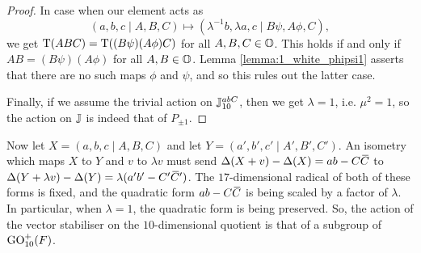 \begin{proof}
    In case when our element acts as
    \begin{equation*}
   		(a,b,c\mid A,B,C) \mapsto (\lambda^{-1} b, \lambda a, c \mid B\psi, A\phi, C),
   	\end{equation*}
    we get $\operatorname{T}(ABC) = \operatorname{T}((B\psi) (A\phi) C)$
    for all $A,B,C \in \mathbb{O}$. This holds if and only if $AB = (B\psi) (A\phi)$ for
    all $A,B \in \mathbb{O}$. Lemma
    \ref{lemma:1_white_phipsi1} asserts that there are no such maps $\phi$ and $\psi$,
    and so this rules out the latter case.
    
    Finally, if we assume the trivial action on $\mathbb{J}_{10}^{abC}$, then we get $\lambda = 1$,
     i.e. 
    $\mu^2 = 1$, so the action on $\mathbb{J}$ is indeed that of $P_{\pm 1}$. 
\end{proof}

Now let $X = (a,b,c\mid A,B,C)$
and let $Y = (a',b',c' \mid A', B', C')$. An isometry which maps $X$ to
    $Y$ and $v$ to $\lambda v$ must send $\Delta(X+v)-\Delta(X) = ab-C\mathord{\mbox{\hspace*{0pt}}\,\overline{\!C\!\!\;}\!\:}\mbox{\hspace*{0pt}} $ to
    $\Delta(Y+\lambda v) - \Delta(Y) = \lambda (a'b' - C'\mathord{\mbox{\hspace*{0pt}}\,\overline{\!C\!\!\;}\!\:}\mbox{\hspace*{0pt}} ')$. The \mbox{$17$-dimensional}
     radical
    of both of these forms is fixed, and the quadratic form $ab-C\mathord{\mbox{\hspace*{0pt}}\,\overline{\!C\!\!\;}\!\:}\mbox{\hspace*{0pt}}$ is being scaled by
    a factor of $\lambda$. In particular, when $\lambda = 1$, the quadratic
    form is being preserved. So, the action of the vector stabiliser on the $10$-dimensional
    quotient is that of a subgroup of $\mathrm{GO}_{10}^+(F)$. 

